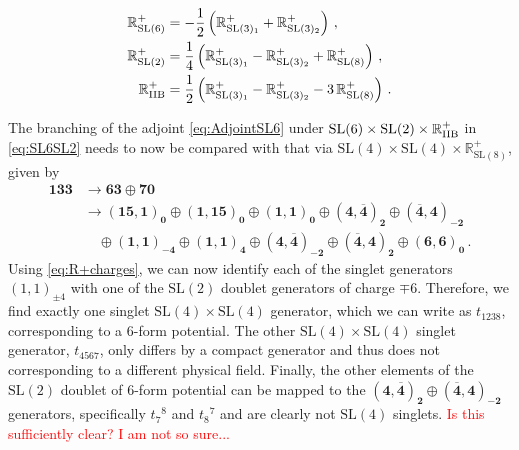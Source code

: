 \documentclass[a4paper, 11pt]{article}
\numberwithin{equation}{section}
\newcommand{\SL}[1]{\mathrm{SL}( #1 )}
\newcommand{\+}{\oplus}
\newcommand{\EM}[1]{\textcolor{red}{#1}}
\begin{document}
\begin{equation} \label{eq:R+charges}
	\begin{split}
		\mathbb{R}^+_{\SL{6}} &= - \frac12 \left( \mathbb{R}^+_{\SL{3}_1} + \mathbb{R}^+_{\SL{3}_2} \right) \,, \\
		\mathbb{R}^+_{\SL{2}} &= \frac14 \left( \mathbb{R}^+_{\SL{3}_1} - \mathbb{R}^+_{\SL{3}_2} + \mathbb{R}^+_{\SL{8}} \right) \,, \\
		\mathbb{R}^+_{\rm IIB} &= \frac12 \left( \mathbb{R}^+_{\SL{3}_1} - \mathbb{R}^+_{\SL{3}_2} - 3\, \mathbb{R}^+_{\SL{8}} \right) \,.
	\end{split}
\end{equation}

The branching of the adjoint \eqref{eq:AdjointSL6} under $\SL{6} \times \SL{2} \times \mathbb{R}^+_{\rm IIB}$ in \eqref{eq:SL6SL2} needs to now be compared with that via $\SL{4} \times \SL{4} \times \mathbb{R}^+_{\SL{8}}$, given by
\begin{equation}
	\begin{split}
		\mathbf{133} &\rightarrow \mathbf{63} \oplus \mathbf{70} \\
		&\rightarrow \mathbf{\left(15,1\right)_0} \oplus \mathbf{\left(1,15\right)_0} \oplus \mathbf{\left(1,1\right)_0} \oplus \mathbf{\left(4,\overline{4}\right)_2} \oplus \mathbf{\left(\overline{4},4\right)_{-2}} \\
		& \quad \oplus \mathbf{\left(1,1\right)_{-4}} \oplus \mathbf{\left(1,1\right)_{4}} \oplus \mathbf{\left(4,\overline{4}\right)_{-2}} \oplus \mathbf{\left(\overline{4},4\right)_{2}} \oplus \mathbf{\left(6,6\right)_0} \,.
	\end{split}
\end{equation}
Using \eqref{eq:R+charges}, we can now identify each of the singlet generators $\left(1,1\right)_{\pm4}$ with one of the $\SL{2}$ doublet generators of charge $\mp 6$. Therefore, we find exactly one singlet $\SL{4} \times \SL{4}$ generator, which we can write as $t_{1238}$, corresponding to a 6-form potential. The other $\SL{4} \times \SL{4}$ singlet generator, $t_{4567}$, only differs by a compact generator and thus does not corresponding to a different physical field. Finally, the other elements of the $\SL{2}$ doublet of 6-form potential can be mapped to the $\mathbf{\left(4,\overline{4}\right)_{2}} \oplus \mathbf{\left(\overline{4},4\right)_{-2}}$ generators, specifically $t_7{}^8$ and $t_8{}^7$ and are clearly not $\SL{4}$ singlets.
\EM{Is this sufficiently clear? I am not so sure...}
\end{document}
